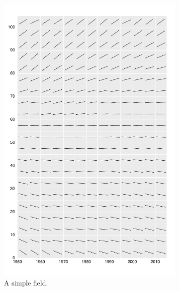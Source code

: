 \documentclass{article}
\begin{document}
\begin{figure}
\begin{subfigure}{.5\textwidth}
  \centering
  \includegraphics[scale=.4]{Figures/FigApp1.pdf}
  \caption{A simple field.}
  \label{fig:sfig1}
\end{subfigure}%
\begin{subfigure}{.5\textwidth}
  \centering

\end{subfigure}
\end{figure}
\end{document}

